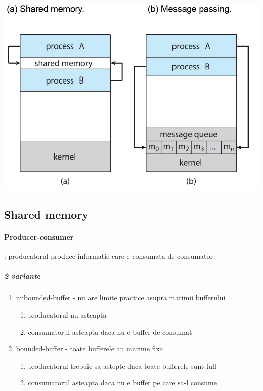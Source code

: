 \documentclass{article}
\begin{document}
\begin{center}
    \includegraphics[scale=0.3]{5_ipc.png}
\end{center}

\subsection*{Shared memory}

\paragraph*{Producer-consumer}: producatorul produce informatie care e consumata de consumator
\subparagraph*{2 variante}
\begin{enumerate}
    \item unbounded-buffer - nu are limite practice asupra marimii bufferului
          \begin{enumerate}
              \item producatorul nu asteapta
              \item consumatorul asteapta daca nu e buffer de consumat
          \end{enumerate}
    \item bounded-buffer - toate bufferele au marime fixa
          \begin{enumerate}
              \item producatorul trebuie sa astepte daca toate bufferele sunt full
              \item consumatorul asteapta daca nu e buffer pe care sa-l consume
          \end{enumerate}
\end{enumerate}
\end{document}
